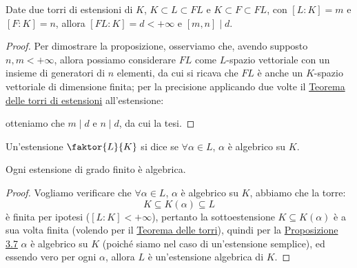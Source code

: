 \documentclass[11pt]{scrartcl}
\begin{document}
\begin{proposition}
    \label{3.9}
    Date due torri di estensioni di $K$, $K \subset L \subset FL$ e $K \subset F \subset FL$, con $[L:K] = m$ e $[F:K] = n$, allora $[FL:K] = d < +\infty$ e $[m,n] \mid d$.
\end{proposition}

\begin{proof}
Per dimostrare la proposizione, osserviamo che, avendo supposto $n,m < +\infty$, allora possiamo considerare $FL$ come $L$-spazio vettoriale con un insieme di generatori di $n$ elementi,
da cui si ricava che $FL$ è anche un $K$-spazio vettoriale di dimensione finita; per la precisione applicando due volte il \hyperref[torri]{Teorema delle torri di estensioni} all'estensione:
\begin{center}
\end{center}
otteniamo che $m \mid d$ e $n \mid d$, da cui la tesi.
\end{proof}

\begin{definition}
    Un'estensione $\faktor{L}{K}$ si dice  se $\forall \alpha \in L$, $\alpha$ è algebrico su $K$.
\end{definition}

\begin{proposition}
    \label{3.11}
    Ogni estensione di grado finito è algebrica.
\end{proposition}

\begin{proof}
    Vogliamo verificare che $\forall \alpha \in L$, $\alpha$ è algebrico su $K$, abbiamo che la torre:
    \[ K \subseteq K(\alpha) \subseteq L
        \]
    è finita per ipotesi ($[L : K] < +\infty$), pertanto la sottoestensione $K \subseteq K(\alpha)$ è a sua volta finita (volendo per il \hyperref[torri]{Teorema delle torri}),
    quindi per la \hyperref[3.7]{Proposizione 3.7} $\alpha$ è algebrico su $K$ (poiché siamo nel caso di un'estensione semplice), ed essendo vero per ogni $\alpha$, allora $L$ è un'estensione algebrica di $K$.
\end{proof}
\end{document}
